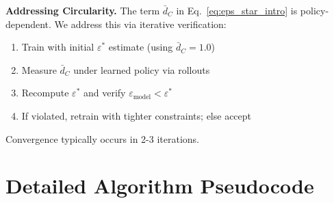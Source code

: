 \documentclass{article}
\theoremstyle{plain}
\theoremstyle{definition}
\theoremstyle{remark}
\begin{document}
\textbf{Addressing Circularity.} The term $\bar{d}_C$ in Eq.~\ref{eq:eps_star_intro} is policy-dependent. We address this via iterative verification:
\begin{enumerate}
    \item Train with initial $\varepsilon^*$ estimate (using $\bar{d}_C = 1.0$)
    \item Measure $\bar{d}_C$ under learned policy via rollouts
    \item Recompute $\varepsilon^*$ and verify $\varepsilon_{\text{model}} < \varepsilon^*$
    \item If violated, retrain with tighter constraints; else accept
\end{enumerate}
Convergence typically occurs in 2-3 iterations.

\section{Detailed Algorithm Pseudocode}
\label{app:algorithms}
\end{document}
